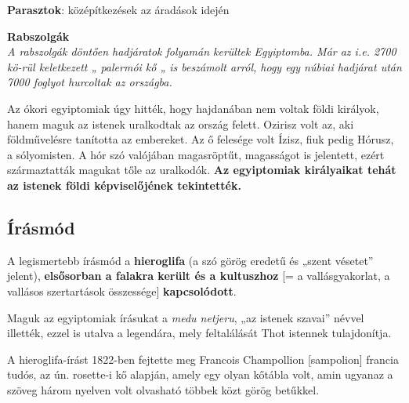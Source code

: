 \begin{compactitem}
	\item \textbf{Parasztok}: középítkezések az áradások idején
	
	\item \textbf{Rabszolgák}\\
	\textit{A rabszolgák döntően hadjáratok folyamán kerültek Egyiptomba. Már az i.e. 2700 kö-rül keletkezett „ palermói kő „ is beszámolt arról, hogy egy núbiai hadjárat  után 7000 foglyot hurcoltak az országba.}
\end{compactitem}

\vspace{0.5cm}

Az ókori egyiptomiak úgy hitték, hogy hajdanában nem voltak földi királyok, hanem maguk az istenek uralkodtak az ország felett. Ozirisz volt az, aki földművelésre tanította az embereket. Az ő felesége volt Ízisz, fiuk pedig Hórusz, a sólyomisten. A hór szó valójában magasröptűt, magasságot is jelentett, ezért származtatták magukat tőle az uralkodók. \textbf{Az egyiptomiak királyaikat tehát az istenek földi képviselőjének tekintették.}

\subsection*{Írásmód}

	\begin{figure}
	\end{figure}

	A legismertebb írásmód a \textbf{hieroglifa} (a szó görög eredetű és „szent vésetet” jelent), \textbf{elsősorban a falakra került és a kultuszhoz} [= a vallásgyakorlat, a vallásos szertartások összessége] \textbf{kapcsolódott}.
	
	Maguk az egyiptomiak írásukat a \textit{medu netjeru}, „az istenek szavai” névvel illették, ezzel is utalva a legendára, mely feltalálását Thot istennek tulajdonítja.
	
	A hieroglifa-írást 1822-ben fejtette meg Francois Champollion [sampolion] francia tudós, az ún. rosette-i kő alapján, amely egy olyan kőtábla volt, amin ugyanaz a szöveg három nyelven volt olvasható többek közt görög betűkkel.

